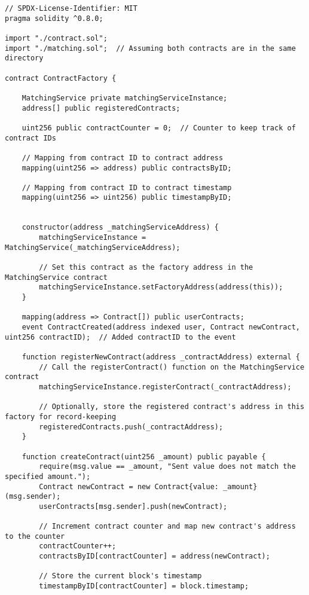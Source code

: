 \begin{lstlisting}
// SPDX-License-Identifier: MIT
pragma solidity ^0.8.0;

import "./contract.sol";
import "./matching.sol";  // Assuming both contracts are in the same directory

contract ContractFactory {

    MatchingService private matchingServiceInstance;
    address[] public registeredContracts;

    uint256 public contractCounter = 0;  // Counter to keep track of contract IDs

    // Mapping from contract ID to contract address
    mapping(uint256 => address) public contractsByID;

    // Mapping from contract ID to contract timestamp
    mapping(uint256 => uint256) public timestampByID;


    constructor(address _matchingServiceAddress) {
        matchingServiceInstance = MatchingService(_matchingServiceAddress);

        // Set this contract as the factory address in the MatchingService contract
        matchingServiceInstance.setFactoryAddress(address(this));
    }

    mapping(address => Contract[]) public userContracts;
    event ContractCreated(address indexed user, Contract newContract, uint256 contractID);  // Added contractID to the event

    function registerNewContract(address _contractAddress) external {
        // Call the registerContract() function on the MatchingService contract
        matchingServiceInstance.registerContract(_contractAddress);

        // Optionally, store the registered contract's address in this factory for record-keeping
        registeredContracts.push(_contractAddress);
    }

    function createContract(uint256 _amount) public payable {
        require(msg.value == _amount, "Sent value does not match the specified amount.");
        Contract newContract = new Contract{value: _amount}(msg.sender);
        userContracts[msg.sender].push(newContract);

        // Increment contract counter and map new contract's address to the counter
        contractCounter++;
        contractsByID[contractCounter] = address(newContract);
        
        // Store the current block's timestamp
        timestampByID[contractCounter] = block.timestamp;


\end{lstlisting}
